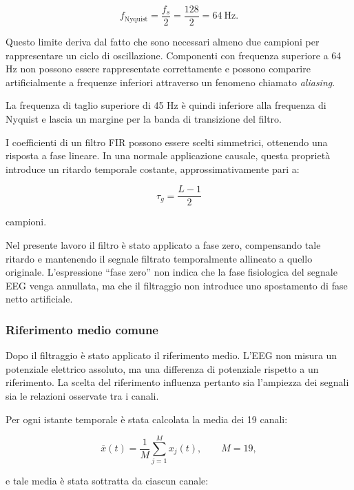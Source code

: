 \begin{equation}
	f_{\mathrm{Nyquist}}
	=
	\frac{f_s}{2}
	=
	\frac{128}{2}
	=
	64\ \mathrm{Hz}.
\end{equation}

Questo limite deriva dal fatto che sono necessari almeno due campioni
per rappresentare un ciclo di oscillazione. Componenti con frequenza
superiore a 64 Hz non possono essere rappresentate correttamente e
possono comparire artificialmente a frequenze inferiori attraverso
un fenomeno chiamato \textit{aliasing}.

La frequenza di taglio superiore di 45 Hz è quindi inferiore alla
frequenza di Nyquist e lascia un margine per la banda di transizione
del filtro.

I coefficienti di un filtro FIR possono essere scelti simmetrici,
ottenendo una risposta a fase lineare. In una normale applicazione
causale, questa proprietà introduce un ritardo temporale costante,
approssimativamente pari a:

\begin{equation}
	\tau_g
	=
	\frac{L-1}{2}
\end{equation}

campioni.

Nel presente lavoro il filtro è stato applicato a fase zero,
compensando tale ritardo e mantenendo il segnale filtrato temporalmente
allineato a quello originale. L'espressione ``fase zero'' non indica
che la fase fisiologica del segnale EEG venga annullata, ma che il
filtraggio non introduce uno spostamento di fase netto artificiale.


\subsubsection{Riferimento medio comune}

Dopo il filtraggio è stato applicato il riferimento medio. L'EEG non misura un potenziale elettrico assoluto, ma una differenza di potenziale rispetto a un riferimento. La scelta del riferimento influenza pertanto sia
l'ampiezza dei segnali sia le relazioni osservate tra i canali.

Per ogni istante temporale è stata calcolata la media dei 19 canali:

\begin{equation}
	\overline{x}(t)
	=
	\frac{1}{M}
	\sum_{j=1}^{M}x_j(t),
	\qquad M=19,
\end{equation}

e tale media è stata sottratta da ciascun canale:


